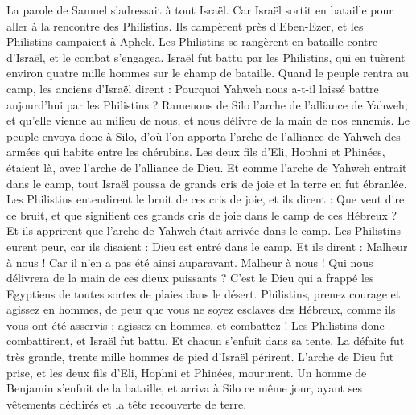 \begin{multicols}{2}
\VerseOne{}La parole de Samuel s’adressait à tout Israël. Car Israël sortit en bataille pour aller à la rencontre des Philistins. Ils campèrent près d'Eben-Ezer, et les Philistins campaient à Aphek.
Les Philistins se rangèrent en bataille contre d'Israël, et le combat s’engagea. Israël fut battu par les Philistins, qui en tuèrent environ quatre mille hommes sur le champ de bataille.
Quand le peuple rentra au camp, les anciens d'Israël dirent : Pourquoi Yahweh nous a-t-il laissé battre aujourd'hui par les Philistins ? Ramenons de Silo l'arche de l'alliance de Yahweh, et qu'elle vienne au milieu de nous, et nous délivre de la main de nos ennemis.
Le peuple envoya donc à Silo, d’où l’on apporta l'arche de l'alliance de Yahweh des armées qui habite entre les chérubins. Les deux fils d’Eli, Hophni et Phinées, étaient là, avec l'arche de l'alliance de Dieu.
Et comme l'arche de Yahweh entrait dans le camp, tout Israël poussa de grands cris de joie et la terre en fut ébranlée.
Les Philistins entendirent le bruit de ces cris de joie, et ils dirent : Que veut dire ce bruit, et que signifient ces grands cris de joie dans le camp de ces Hébreux ? Et ils apprirent que l'arche de Yahweh était arrivée dans le camp.
Les Philistins eurent peur, car ils disaient : Dieu est entré dans le camp. Et ils dirent : Malheur à nous ! Car il n’en a pas été ainsi auparavant.
Malheur à nous ! Qui nous délivrera de la main de ces dieux puissants ? C’est le Dieu qui a frappé les Egyptiens de toutes sortes de plaies dans le désert.
Philistins, prenez courage et agissez en hommes, de peur que vous ne soyez esclaves des Hébreux, comme ils vous ont été asservis ; agissez en hommes, et combattez !
Les Philistins donc combattirent, et Israël fut battu. Et chacun s’enfuit dans sa tente. La défaite fut très grande, trente mille hommes de pied d'Israël périrent.
L'arche de Dieu fut prise, et les deux fils d'Eli, Hophni et Phinées, moururent.
Un homme de Benjamin s'enfuit de la bataille, et arriva à Silo ce même jour, ayant ses vêtements déchirés et la tête recouverte de terre.

\end{multicols}
